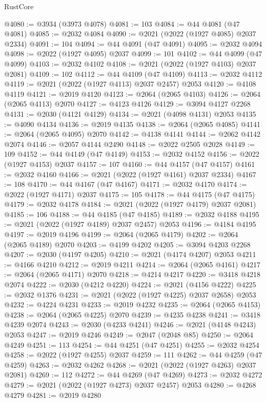 \begin{lexlean}{RustCore}
\begin{coremodule}
@4080 := @3934 (@3973 @4078)
@4081 := 103
@4084 := @44 @4081 (@47 @4081)
@4085 := @2032 @4084
@4090 := @2021 (@2022 (@1927 @4085) @2037 @2334)
@4091 := 104
@4094 := @44 @4091 (@47 @4091)
@4095 := @2032 @4094
@4098 := @2022 (@1927 @4095) @2037
@4099 := 101
@4102 := @44 @4099 (@47 @4099)
@4103 := @2032 @4102
@4108 := @2021 (@2022 (@1927 @4103) @2037 @2081)
@4109 := 102
@4112 := @44 @4109 (@47 @4109)
@4113 := @2032 @4112
@4119 := @2021 (@2022 (@1927 @4113) @2037 @2457) @2053
@4120 := @4108 @4119
@4121 := @2019 @4120
@4123 := @2064 (@2065 @4103)
@4126 := @2064 (@2065 @4113) @2070
@4127 := @4123 @4126
@4129 := @3094 @4127 @2268
@4131 := @2030 (@4121 @4129)
@4134 := @2021 (@4098 @4131) @2053
@4135 := @4090 @4134
@4136 := @2019 @4135
@4138 := @2064 (@2065 @4085)
@4141 := @2064 (@2065 @4095) @2070
@4142 := @4138 @4141
@4144 := @2062 @4142 @2074
@4146 := @2057 @4144 @2490
@4148 := @2022 @2505 @2028
@4149 := 109
@4152 := @44 @4149 (@47 @4149)
@4153 := @2032 @4152
@4156 := @2022 (@1927 @4153) @2037
@4157 := 107
@4160 := @44 @4157 (@47 @4157)
@4161 := @2032 @4160
@4166 := @2021 (@2022 (@1927 @4161) @2037 @2334)
@4167 := 108
@4170 := @44 @4167 (@47 @4167)
@4171 := @2032 @4170
@4174 := @2022 (@1927 @4171) @2037
@4175 := 105
@4178 := @44 @4175 (@47 @4175)
@4179 := @2032 @4178
@4184 := @2021 (@2022 (@1927 @4179) @2037 @2081)
@4185 := 106
@4188 := @44 @4185 (@47 @4185)
@4189 := @2032 @4188
@4195 := @2021 (@2022 (@1927 @4189) @2037 @2457) @2053
@4196 := @4184 @4195
@4197 := @2019 @4196
@4199 := @2064 (@2065 @4179)
@4202 := @2064 (@2065 @4189) @2070
@4203 := @4199 @4202
@4205 := @3094 @4203 @2268
@4207 := @2030 (@4197 @4205)
@4210 := @2021 (@4174 @4207) @2053
@4211 := @4166 @4210
@4212 := @2019 @4211
@4214 := @2064 (@2065 @4161)
@4217 := @2064 (@2065 @4171) @2070
@4218 := @4214 @4217
@4220 := @3418 @4218 @2074
@4222 := @2030 (@4212 @4220)
@4224 := @2021 (@4156 @4222)
@4225 := @2032 @1376
@4231 := @2021 (@2022 (@1927 @4225) @2037 @2658) @2053
@4232 := @4224 @4231
@4233 := @2019 @4232
@4235 := @2064 (@2065 @4153)
@4238 := @2064 (@2065 @4225) @2070
@4239 := @4235 @4238
@4241 := @3418 @4239 @2074
@4243 := @2030 (@4233 @4241)
@4246 := @2021 (@4148 @4243) @2053
@4247 := @2019 @4246
@4249 := @2047 (@2048 @85)
@4250 := @2064 @4249
@4251 := 113
@4254 := @44 @4251 (@47 @4251)
@4255 := @2032 @4254
@4258 := @2022 (@1927 @4255) @2037
@4259 := 111
@4262 := @44 @4259 (@47 @4259)
@4263 := @2032 @4262
@4268 := @2021 (@2022 (@1927 @4263) @2037 @2081)
@4269 := 112
@4272 := @44 @4269 (@47 @4269)
@4273 := @2032 @4272
@4279 := @2021 (@2022 (@1927 @4273) @2037 @2457) @2053
@4280 := @4268 @4279
@4281 := @2019 @4280

\end{coremodule}
\end{lexlean}
